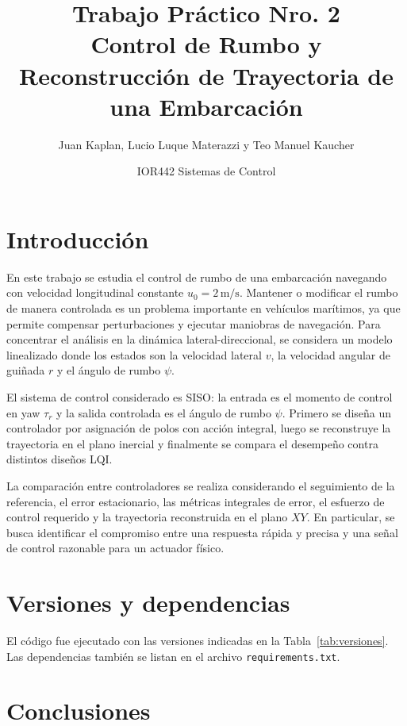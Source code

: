 \documentclass[11pt,a4paper]{article}
\title{Trabajo Práctico Nro. 2\\Control de Rumbo y Reconstrucción de Trayectoria de una Embarcación}
\author{Juan Kaplan, Lucio Luque Materazzi y Teo Manuel Kaucher}
\date{IOR442 Sistemas de Control}
\begin{document}
\maketitle
\tableofcontents
\newpage

\section{Introducción}

En este trabajo se estudia el control de rumbo de una embarcación navegando con velocidad longitudinal constante $u_0 = 2\,\mathrm{m/s}$. Mantener o modificar el rumbo de manera controlada es un problema importante en vehículos marítimos, ya que permite compensar perturbaciones y ejecutar maniobras de navegación. Para concentrar el análisis en la dinámica lateral-direccional, se considera un modelo linealizado donde los estados son la velocidad lateral $v$, la velocidad angular de guiñada $r$ y el ángulo de rumbo $\psi$.

El sistema de control considerado es SISO: la entrada es el momento de control en yaw $\tau_r$ y la salida controlada es el ángulo de rumbo $\psi$. Primero se diseña un controlador por asignación de polos con acción integral, luego se reconstruye la trayectoria en el plano inercial y finalmente se compara el desempeño contra distintos diseños LQI.

La comparación entre controladores se realiza considerando el seguimiento de la referencia, el error estacionario, las métricas integrales de error, el esfuerzo de control requerido y la trayectoria reconstruida en el plano $XY$. En particular, se busca identificar el compromiso entre una respuesta rápida y precisa y una señal de control razonable para un actuador físico.

\section{Versiones y dependencias}

El código fue ejecutado con las versiones indicadas en la Tabla~\ref{tab:versiones}. Las dependencias también se listan en el archivo \texttt{requirements.txt}.







\section{Conclusiones}
\end{document}
